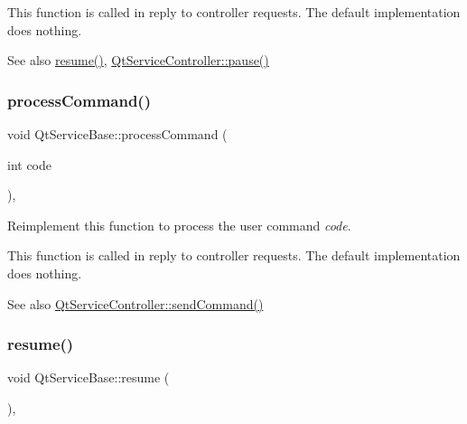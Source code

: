 This function is called in reply to controller requests. The default implementation does nothing.

\begin{DoxySeeAlso}{See also}
\hyperlink{class_qt_service_base_aaa2e05ef1c36283b6b35348c3972b489}{resume()}, \hyperlink{class_qt_service_controller_aeee2fcc9469f77c7ed8a7955c4fa3a07}{Qt\+Service\+Controller\+::pause()} 
\end{DoxySeeAlso}
\mbox{\label{class_qt_service_base_a47485f00f6eba0758d2ffc75092295cf}} 
\subsubsection{\texorpdfstring{process\+Command()}{processCommand()}}
{\footnotesize\ttfamily void Qt\+Service\+Base\+::process\+Command (\begin{DoxyParamCaption}\item[{int}]{code }\end{DoxyParamCaption})\hspace{0.3cm}{\ttfamily [protected]}, {\ttfamily [virtual]}}

Reimplement this function to process the user command {\itshape code}.

This function is called in reply to controller requests. The default implementation does nothing.

\begin{DoxySeeAlso}{See also}
\hyperlink{class_qt_service_controller_a1428c7d51403416bc7663ae37c446cfc}{Qt\+Service\+Controller\+::send\+Command()} 
\end{DoxySeeAlso}
\mbox{\label{class_qt_service_base_aaa2e05ef1c36283b6b35348c3972b489}} 
\subsubsection{\texorpdfstring{resume()}{resume()}}
{\footnotesize\ttfamily void Qt\+Service\+Base\+::resume (\begin{DoxyParamCaption}{ }\end{DoxyParamCaption})\hspace{0.3cm}{\ttfamily [protected]}, {\ttfamily [virtual]}}

